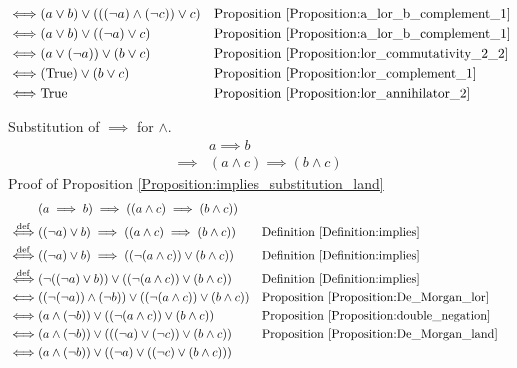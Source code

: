 \begin{prop}
\begin{align*}
\iff & (a \lor b) \lor (((\lnot a) \land (\lnot c)) \lor c)
& & \text{Proposition \ref{Proposition:a_lor_b_complement_1}} \\
\iff & (a \lor b) \lor ((\lnot a) \lor c)
& & \text{Proposition \ref{Proposition:a_lor_b_complement_1}} \\
\iff & (a \lor (\lnot a)) \lor (b \lor c)
& & \text{Proposition \ref{Proposition:lor_commutativity_2_2}} \\
\iff & (\text{True}) \lor (b \lor c)
& & \text{Proposition \ref{Proposition:lor_complement_1}} \\
\iff & \text{True}
& & \text{Proposition \ref{Proposition:lor_annihilator_2}} \\
\end{align*}
\end{prop}

\begin{prop}
\label{Proposition:implies_substitution_land}
Substitution of $\implies$ for $\land$.
\begin{align*}
& a \implies b \\
\implies & (a \land c) \implies (b \land c)
\end{align*}
Proof of Proposition \ref{Proposition:implies_substitution_land}
\begin{align*}
& (a \implies b) \implies ((a \land c) \implies (b \land c)) \\
\overset{\operatorname{def}}{\iff} & ((\lnot a) \lor b) \implies ((a \land c) \implies (b \land c))
& & \text{Definition \ref{Definition:implies}} \\
\overset{\operatorname{def}}{\iff} & ((\lnot a) \lor b) \implies ((\lnot (a \land c)) \lor (b \land c))
& & \text{Definition \ref{Definition:implies}} \\
\overset{\operatorname{def}}{\iff} & (\lnot ((\lnot a) \lor b)) \lor ((\lnot (a \land c)) \lor (b \land c))
& & \text{Definition \ref{Definition:implies}} \\
\iff & ((\lnot (\lnot a)) \land (\lnot b)) \lor ((\lnot (a \land c)) \lor (b \land c))
& & \text{Proposition \ref{Proposition:De_Morgan_lor}} \\
\iff & (a \land (\lnot b)) \lor ((\lnot (a \land c)) \lor (b \land c))
& & \text{Proposition \ref{Proposition:double_negation}} \\
\iff & (a \land (\lnot b)) \lor (((\lnot a) \lor (\lnot c)) \lor (b \land c))
& & \text{Proposition \ref{Proposition:De_Morgan_land}} \\
\iff & (a \land (\lnot b)) \lor ((\lnot a) \lor ((\lnot c) \lor (b \land c)))

\end{align*}
\end{prop}
